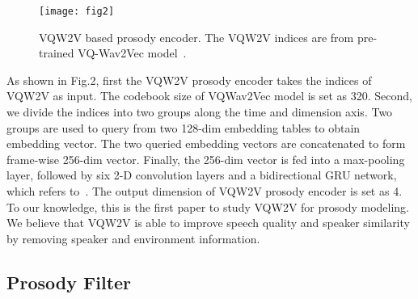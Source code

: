 \documentclass{article}
\begin{document}
\begin{figure}[htb]

\begin{minipage}[b]{1.0\linewidth}
  \centering
  \centerline{\texttt{[image: fig2]}}
\end{minipage}

%
\caption{VQW2V based prosody encoder. The VQW2V indices are from pre-trained VQ-Wav2Vec model~\cite{2019Unsupervised}.}
\label{fig:res}
%
\end{figure}



As shown in Fig.2, first the VQW2V prosody encoder takes the indices of VQW2V as input. The codebook size of VQWav2Vec model is set as 320. Second, we divide the indices into two groups along the time and dimension axis. Two groups are used to query from two 128-dim embedding tables to obtain embedding vector. The two queried embedding vectors are concatenated to form frame-wise 256-dim vector. Finally, the  256-dim vector is fed into a max-pooling layer, followed by six 2-D convolution layers and a bidirectional GRU network, which refers to~\cite{li2021ppg}. The  output dimension of VQW2V prosody encoder is set as 4. To our knowledge, this is the first paper to study VQW2V for prosody modeling. We believe that VQW2V is able to improve speech quality and speaker similarity by removing speaker and environment information. 

\subsection{Prosody Filter}
\label{ssec:subhead}

\end{document}
